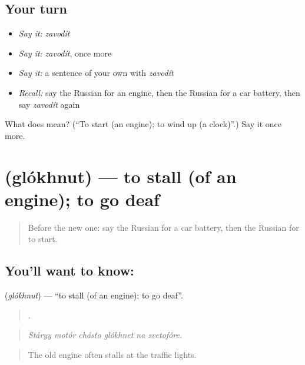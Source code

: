 \subsection*{Your turn}
\begin{itemize}
\raggedright
  \item \emph{Say it:} \emph{zavodít}
  \item \emph{Say it:} \emph{zavodít}, once more
  \item \emph{Say it:} a sentence of your own with \emph{zavodít}
  \item \emph{Recall:} say the Russian for an engine, then the Russian for a car battery, then say \emph{zavodít} again
\end{itemize}

\begin{tcolorbox}[breakable,colback=teal!4,colframe=teal!35!black,title={Before you move on}]
What does  mean? (\textquotedblleft{}To start (an engine); to wind up (a clock)\textquotedblright{}.) Say it once more.
\end{tcolorbox}
\section[\texorpdfstring{\ru{глохнуть} (glókhnut)}{глохнуть (glókhnut)}]{ (glókhnut) — to stall (of an engine); to go deaf}

\label{lesson:RU-C404-glokhnut}



\begin{quote}
Before the new one: say the Russian for a car battery, then the Russian for to start.
\end{quote}

\subsection*{You'll want to know: }
\textbf{} (\emph{glókhnut}) — \textquotedblleft{}to stall (of an engine); to go deaf\textquotedblright{}.

\begin{quote}
     .
\end{quote}

\begin{quote}
\emph{Stáryy motór chásto glókhnet na svetofóre.}
\end{quote}

\begin{quote}
The old engine often stalls at the traffic lights.
\end{quote}

